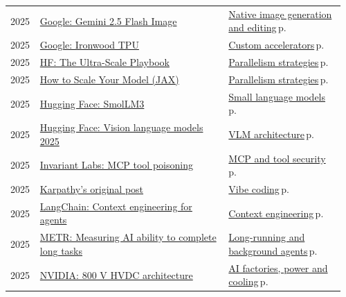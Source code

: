\documentclass[10pt,a4paper,openany]{report}
\begin{document}
{\begin{longtable}{@{}p{0.07\linewidth}>{\raggedright}p{0.55\linewidth}>{\raggedright\arraybackslash}p{0.34\linewidth}@{}}
2025 & \href{https://developers.googleblog.com/en/introducing-gemini-2-5-flash-image/}{Google: Gemini 2.5 Flash Image} & \hyperref[c:vlm-8]{Native image generation and editing}\,{\color{muted}\scriptsize p.\,\pageref{c:vlm-8}}\\
2025 & \href{https://blog.google/products/google-cloud/ironwood-tpu-age-of-inference/}{Google: Ironwood TPU} & \hyperref[c:hardware-11]{Custom accelerators}\,{\color{muted}\scriptsize p.\,\pageref{c:hardware-11}}\\
2025 & \href{https://huggingface.co/spaces/nanotron/ultrascale-playbook}{HF: The Ultra-Scale Playbook} & \hyperref[c:training-0]{Parallelism strategies}\,{\color{muted}\scriptsize p.\,\pageref{c:training-0}}\\
2025 & \href{https://jax-ml.github.io/scaling-book/}{How to Scale Your Model (JAX)} & \hyperref[c:training-0]{Parallelism strategies}\,{\color{muted}\scriptsize p.\,\pageref{c:training-0}}\\
2025 & \href{https://huggingface.co/blog/smollm3}{Hugging Face: SmolLM3} & \hyperref[c:arch-11]{Small language models}\,{\color{muted}\scriptsize p.\,\pageref{c:arch-11}}\\
2025 & \href{https://huggingface.co/blog/vlms-2025}{Hugging Face: Vision language models 2025} & \hyperref[c:vlm-0]{VLM architecture}\,{\color{muted}\scriptsize p.\,\pageref{c:vlm-0}}\\
2025 & \href{https://invariantlabs.ai/blog/mcp-security-notification-tool-poisoning-attacks}{Invariant Labs: MCP tool poisoning} & \hyperref[c:safety-4]{MCP and tool security}\,{\color{muted}\scriptsize p.\,\pageref{c:safety-4}}\\
2025 & \href{https://x.com/karpathy/status/1886192184808149383}{Karpathy's original post} & \hyperref[c:coding-1]{Vibe coding}\,{\color{muted}\scriptsize p.\,\pageref{c:coding-1}}\\
2025 & \href{https://blog.langchain.com/context-engineering-for-agents/}{LangChain: Context engineering for agents} & \hyperref[c:context-0]{Context engineering}\,{\color{muted}\scriptsize p.\,\pageref{c:context-0}}\\
2025 & \href{https://metr.org/blog/2025-03-19-measuring-ai-ability-to-complete-long-tasks/}{METR: Measuring AI ability to complete long tasks} & \hyperref[c:agents-8]{Long-running and background agents}\,{\color{muted}\scriptsize p.\,\pageref{c:agents-8}}\\
2025 & \href{https://developer.nvidia.com/blog/nvidia-800-v-hvdc-architecture-will-power-the-next-generation-of-ai-factories/}{NVIDIA: 800 V HVDC architecture} & \hyperref[c:hardware-12]{AI factories, power and cooling}\,{\color{muted}\scriptsize p.\,\pageref{c:hardware-12}}\\

\end{longtable}}
\end{document}
